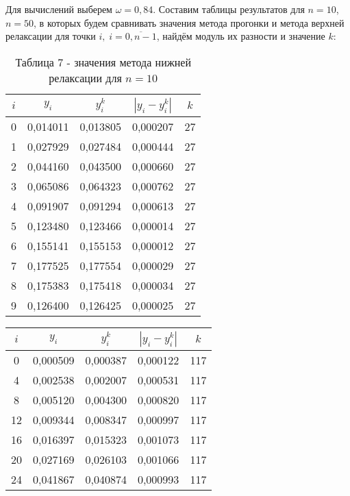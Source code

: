 \documentclass[a4paper,12pt]{article}
\begin{document}
{Для вычислений выберем $\omega = 0,84$. Составим таблицы результатов для $n = 10$, $n = 50$,
в которых будем сравнивать значения метода прогонки и метода верхней релаксации для точки $i,\; i = \overline{0, n-1}$,
найдём модуль их разности и значение $k$:
\begin{table}[h]
    \centering
    \begin{tabular}{|c|c|c|c|c|}
        \hline
        $i$ & $y_i$ & $y_i^k$ & $\left|y_i - y_i^k\right|$ & $k$\\
        \hline
		0 & 0,014011 &  0,013805 &  0,000207 & 27 \\ \hline
		1 & 0,027929 &  0,027484 &  0,000444 & 27 \\ \hline
		2 & 0,044160 &  0,043500 &  0,000660 & 27 \\ \hline
		3 & 0,065086 &  0,064323 &  0,000762 & 27 \\ \hline
		4 & 0,091907 &  0,091294 &  0,000613 & 27 \\ \hline
		5 & 0,123480 &  0,123466 &  0,000014 & 27 \\ \hline
		6 & 0,155141 &  0,155153 &  0,000012 & 27 \\ \hline
		7 & 0,177525 &  0,177554 &  0,000029 & 27 \\ \hline
		8 & 0,175383 &  0,175418 &  0,000034 & 27 \\ \hline
		9 & 0,126400 &  0,126425 &  0,000025 & 27 \\ \hline
    \end{tabular}
    \caption*{\small{Таблица 7 - значения метода нижней релаксации для $n = 10$}}
\end{table}
\clearpage
\begin{table}[h]
    \centering
    \begin{tabular}{|c|c|c|c|c|}
        \hline
        $i$ & $y_i$ & $y_i^k$ & $\left|y_i - y_i^k\right|$ & $k$\\
        \hline
	    0 & 0,000509 & 0,000387 & 0,000122 & 117 \\ \hline
	    4 & 0,002538 & 0,002007 & 0,000531 & 117 \\ \hline
	    8 & 0,005120 & 0,004300 & 0,000820 & 117 \\ \hline
	   12 & 0,009344 & 0,008347 & 0,000997 & 117 \\ \hline
	   16 & 0,016397 & 0,015323 & 0,001073 & 117 \\ \hline
	   20 & 0,027169 & 0,026103 & 0,001066 & 117 \\ \hline
	   24 & 0,041867 & 0,040874 & 0,000993 & 117 \\ \hline

\end{tabular}
\end{table}}
\end{document}
